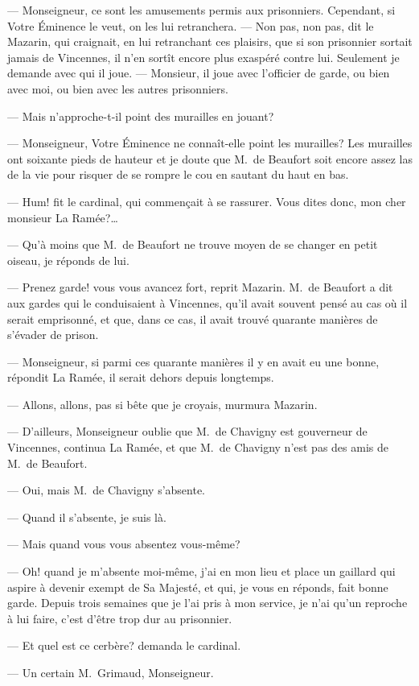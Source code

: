 — Monseigneur, ce sont les amusements permis aux prisonniers. Cependant, si Votre Éminence le veut, on les lui retranchera.
— Non pas, non pas, dit le Mazarin, qui craignait, en lui retranchant ces plaisirs, que si son prisonnier sortait jamais de
Vincennes, il n'en sortît encore plus exaspéré contre lui. Seulement je demande avec qui il joue.
— Monsieur, il joue avec l'officier de garde, ou bien avec moi, ou bien avec les autres prisonniers.

— Mais n'approche-t-il point des murailles en jouant?

— Monseigneur, Votre Éminence ne connaît-elle point les murailles? Les murailles ont soixante pieds de hauteur et je doute que M.~de Beaufort soit encore assez las de la vie pour risquer de se rompre le cou en sautant du haut en bas.

— Hum! fit le cardinal, qui commençait à se rassurer. Vous dites donc, mon cher monsieur La Ramée?\dots

— Qu'à moins que M.~de Beaufort ne trouve moyen de se changer en petit oiseau, je réponds de lui.

— Prenez garde! vous vous avancez fort, reprit Mazarin. M.~de Beaufort a dit aux gardes qui le conduisaient à Vincennes, qu'il avait souvent pensé au cas où il serait emprisonné, et que, dans ce cas, il avait trouvé quarante manières de s'évader de prison.

— Monseigneur, si parmi ces quarante manières il y en avait eu une bonne, répondit La Ramée, il serait dehors depuis longtemps.

— Allons, allons, pas si bête que je croyais, murmura Mazarin.

— D'ailleurs, Monseigneur oublie que M.~de Chavigny est gouverneur de Vincennes, continua La Ramée, et que M.~de Chavigny n'est pas des amis de M.~de Beaufort.

— Oui, mais M.~de Chavigny s'absente.

— Quand il s'absente, je suis là.

— Mais quand vous vous absentez vous-même?

— Oh! quand je m'absente moi-même, j'ai en mon lieu et place un gaillard qui aspire à devenir exempt de Sa Majesté, et qui, je vous en réponds, fait bonne garde. Depuis trois semaines que je l'ai pris à mon service, je n'ai qu'un reproche à lui faire, c'est d'être trop dur au prisonnier.

— Et quel est ce cerbère? demanda le cardinal.

— Un certain M.~Grimaud, Monseigneur.

